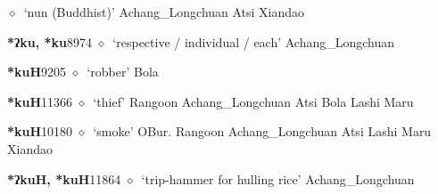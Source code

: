 \begin{list}{}{\leftmargin=1.5em \itemindent=-1.5em}
         $\diamond$~`nun (Buddhist)'
         Achang\_Longchuan 
\hspace{1ex}
         Atsi 
\hspace{1ex}
         Xiandao 
  \item {\footnotesize \textbf{*ʔku, *ku}}{\tiny 8974}
\hspace{1ex}
         $\diamond$~`respective / individual / each'
         Achang\_Longchuan 
  \item {\footnotesize \textbf{*kuH}}{\tiny 9205}
\hspace{1ex}
         $\diamond$~`robber'
         Bola 
  \item {\footnotesize \textbf{*kuH}}{\tiny 11366}
\hspace{1ex}
         $\diamond$~`thief'
         Rangoon 
\hspace{1ex}
         Achang\_Longchuan 
\hspace{1ex}
         Atsi 
\hspace{1ex}
         Bola 
\hspace{1ex}
         Lashi 
\hspace{1ex}
         Maru 
  \item {\footnotesize \textbf{*kuH}}{\tiny 10180}
\hspace{1ex}
         $\diamond$~`smoke'
         OBur. 
\hspace{1ex}
         Rangoon 
\hspace{1ex}
         Achang\_Longchuan 
\hspace{1ex}
         Atsi 
\hspace{1ex}
         Lashi 
\hspace{1ex}
         Maru 
\hspace{1ex}
         Xiandao 
  \item {\footnotesize \textbf{*ʔkuH, *kuH}}{\tiny 11864}
\hspace{1ex}
         $\diamond$~`trip-hammer for hulling rice'
         Achang\_Longchuan 
  \end{list}
